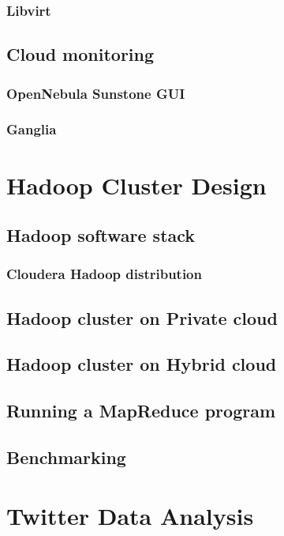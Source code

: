 \documentclass[12pt,a4paper]{report}
\begin{document}
\subsection{Libvirt}

\section{Cloud monitoring}
\subsection{OpenNebula Sunstone GUI}
\subsection{Ganglia}

\chapter{Hadoop Cluster Design}

\section{Hadoop software stack}
\subsection{Cloudera Hadoop distribution}
\section{Hadoop cluster on Private cloud}
\section{Hadoop cluster on Hybrid cloud}
\section{Running a MapReduce program}
\section{Benchmarking}


\chapter{Twitter Data Analysis}
\end{document}
